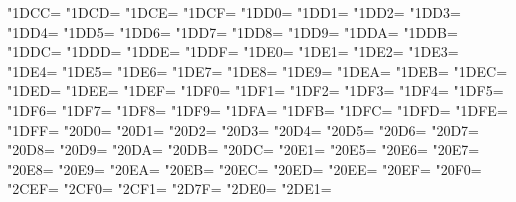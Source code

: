 \XeTeXcharclass"1DCC=\KclassCM
\XeTeXcharclass"1DCD=\KclassCM
\XeTeXcharclass"1DCE=\KclassCM
\XeTeXcharclass"1DCF=\KclassCM
\XeTeXcharclass"1DD0=\KclassCM
\XeTeXcharclass"1DD1=\KclassCM
\XeTeXcharclass"1DD2=\KclassCM
\XeTeXcharclass"1DD3=\KclassCM
\XeTeXcharclass"1DD4=\KclassCM
\XeTeXcharclass"1DD5=\KclassCM
\XeTeXcharclass"1DD6=\KclassCM
\XeTeXcharclass"1DD7=\KclassCM
\XeTeXcharclass"1DD8=\KclassCM
\XeTeXcharclass"1DD9=\KclassCM
\XeTeXcharclass"1DDA=\KclassCM
\XeTeXcharclass"1DDB=\KclassCM
\XeTeXcharclass"1DDC=\KclassCM
\XeTeXcharclass"1DDD=\KclassCM
\XeTeXcharclass"1DDE=\KclassCM
\XeTeXcharclass"1DDF=\KclassCM
\XeTeXcharclass"1DE0=\KclassCM
\XeTeXcharclass"1DE1=\KclassCM
\XeTeXcharclass"1DE2=\KclassCM
\XeTeXcharclass"1DE3=\KclassCM
\XeTeXcharclass"1DE4=\KclassCM
\XeTeXcharclass"1DE5=\KclassCM
\XeTeXcharclass"1DE6=\KclassCM
\XeTeXcharclass"1DE7=\KclassCM
\XeTeXcharclass"1DE8=\KclassCM
\XeTeXcharclass"1DE9=\KclassCM
\XeTeXcharclass"1DEA=\KclassCM
\XeTeXcharclass"1DEB=\KclassCM
\XeTeXcharclass"1DEC=\KclassCM
\XeTeXcharclass"1DED=\KclassCM
\XeTeXcharclass"1DEE=\KclassCM
\XeTeXcharclass"1DEF=\KclassCM
\XeTeXcharclass"1DF0=\KclassCM
\XeTeXcharclass"1DF1=\KclassCM
\XeTeXcharclass"1DF2=\KclassCM
\XeTeXcharclass"1DF3=\KclassCM
\XeTeXcharclass"1DF4=\KclassCM
\XeTeXcharclass"1DF5=\KclassCM
\XeTeXcharclass"1DF6=\KclassCM
\XeTeXcharclass"1DF7=\KclassCM
\XeTeXcharclass"1DF8=\KclassCM
\XeTeXcharclass"1DF9=\KclassCM
\XeTeXcharclass"1DFA=\KclassCM
\XeTeXcharclass"1DFB=\KclassCM
\XeTeXcharclass"1DFC=\KclassCM
\XeTeXcharclass"1DFD=\KclassCM
\XeTeXcharclass"1DFE=\KclassCM
\XeTeXcharclass"1DFF=\KclassCM
\XeTeXcharclass"20D0=\KclassCM
\XeTeXcharclass"20D1=\KclassCM
\XeTeXcharclass"20D2=\KclassCM
\XeTeXcharclass"20D3=\KclassCM
\XeTeXcharclass"20D4=\KclassCM
\XeTeXcharclass"20D5=\KclassCM
\XeTeXcharclass"20D6=\KclassCM
\XeTeXcharclass"20D7=\KclassCM
\XeTeXcharclass"20D8=\KclassCM
\XeTeXcharclass"20D9=\KclassCM
\XeTeXcharclass"20DA=\KclassCM
\XeTeXcharclass"20DB=\KclassCM
\XeTeXcharclass"20DC=\KclassCM
\XeTeXcharclass"20E1=\KclassCM
\XeTeXcharclass"20E5=\KclassCM
\XeTeXcharclass"20E6=\KclassCM
\XeTeXcharclass"20E7=\KclassCM
\XeTeXcharclass"20E8=\KclassCM
\XeTeXcharclass"20E9=\KclassCM
\XeTeXcharclass"20EA=\KclassCM
\XeTeXcharclass"20EB=\KclassCM
\XeTeXcharclass"20EC=\KclassCM
\XeTeXcharclass"20ED=\KclassCM
\XeTeXcharclass"20EE=\KclassCM
\XeTeXcharclass"20EF=\KclassCM
\XeTeXcharclass"20F0=\KclassCM
\XeTeXcharclass"2CEF=\KclassCM
\XeTeXcharclass"2CF0=\KclassCM
\XeTeXcharclass"2CF1=\KclassCM
\XeTeXcharclass"2D7F=\KclassCM
\XeTeXcharclass"2DE0=\KclassCM
\XeTeXcharclass"2DE1=\KclassCM
